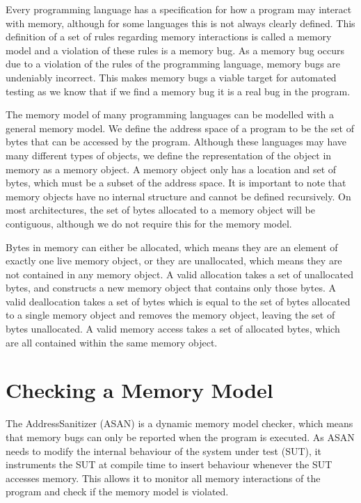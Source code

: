 \documentclass[12pt,twoside]{report}
\begin{document}

Every programming language has a specification for how a program may interact with memory, although for some languages this is not always clearly defined. This definition of a set of rules regarding memory interactions is called a memory model and a violation of these rules is a memory bug. As a memory bug occurs due to a violation of the rules of the programming language, memory bugs are undeniably incorrect. This makes memory bugs a viable target for automated testing as we know that if we find a memory bug it is a real bug in the program.

The memory model of many programming languages can be modelled with a general memory model. We define the address space of a program to be the set of bytes that can be accessed by the program. Although these languages may have many different types of objects, we define the representation of the object in memory as a memory object. A memory object only has a location and set of bytes, which must be a subset of the address space. It is important to note that memory objects have no internal structure and cannot be defined recursively. On most architectures, the set of bytes allocated to a memory object will be contiguous, although we do not require this for the memory model.

Bytes in memory can either be allocated, which means they are an element of exactly one live memory object, or they are unallocated, which means they are not contained in any memory object. A valid allocation takes a set of unallocated bytes, and constructs a new memory object that contains only those bytes. A valid deallocation takes a set of bytes which is equal to the set of bytes allocated to a single memory object and removes the memory object, leaving the set of bytes unallocated. A valid memory access takes a set of allocated bytes, which are all contained within the same memory object.

\section{Checking a Memory Model}
The AddressSanitizer \cite{180957} (ASAN) is a dynamic memory model checker, which means that memory bugs can only be reported when the program is executed. As ASAN needs to modify the internal behaviour of the system under test (SUT), it instruments the SUT at compile time to insert behaviour whenever the SUT accesses memory. This allows it to monitor all memory interactions of the program and check if the memory model is violated.
\end{document}
